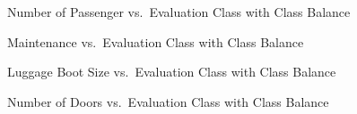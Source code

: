 \documentclass[
  letterpaper,
  DIV=11,
  numbers=noendperiod]{scrartcl}
\begin{document}
\begin{figure}


\caption{\label{fig-car_persons_balance_plot}Number of Passenger
vs.~Evaluation Class with Class Balance}

\end{figure}%

\begin{figure}


\caption{\label{fig-car_maintenance_balance_plot}Maintenance
vs.~Evaluation Class with Class Balance}

\end{figure}%

\begin{figure}


\caption{\label{fig-car_luggage_balance_plot}Luggage Boot Size
vs.~Evaluation Class with Class Balance}

\end{figure}%

\begin{figure}


\caption{\label{fig-car_doors_balance_plot}Number of Doors
vs.~Evaluation Class with Class Balance}

\end{figure}%
\end{document}
